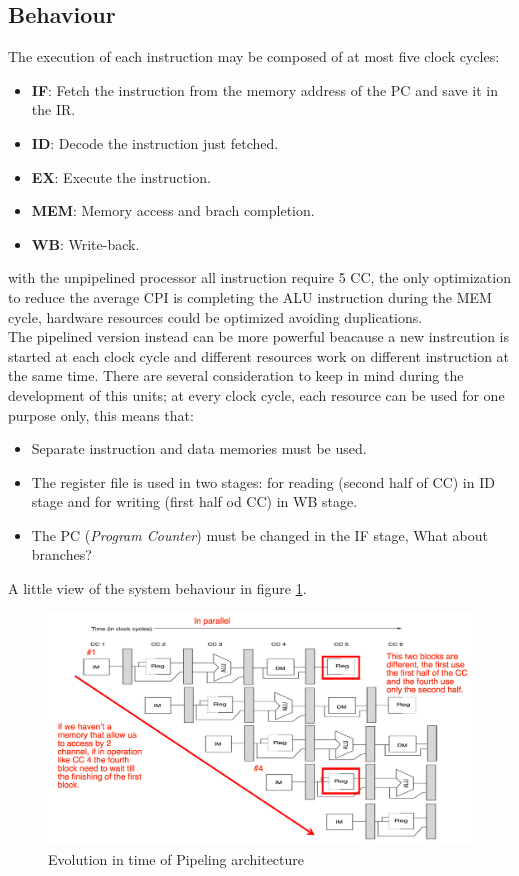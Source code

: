 \documentclass[12pt]{article}
\begin{document}
\subsection{Behaviour}
The execution of each instruction may be composed of at most five clock cycles:
\begin{itemize}
  \item \textbf{IF}: Fetch the instruction from the memory address of the PC and save it in the IR.
  \item \textbf{ID}: Decode the instruction just fetched.
  \item \textbf{EX}: Execute the instruction.
  \item \textbf{MEM}: Memory access and brach completion.
  \item \textbf{WB}: Write-back.
\end{itemize}
with the unpipelined processor all instruction require 5 CC, the only optimization to reduce the average CPI is completing the ALU instruction during the MEM cycle, hardware resources could be optimized avoiding duplications.\\
The pipelined version instead can be more powerful beacause a new instrcution is started at each clock cycle and different  resources work on different instruction at the same time. There are several consideration to keep in mind during the development of this units; at every clock cycle, each resource can be used for one purpose only, this means that:
\begin{itemize}
  \item Separate instruction and data memories must be used.
  \item The register file is used in two stages: for reading (second half of CC) in ID stage and for writing (first half od CC) in WB stage.
  \item The PC (\textit{Program Counter}) must be changed in the IF stage, What about branches?
\end{itemize}
A little view of the system behaviour in figure \ref{fig:time_evo_pipe}.
\begin{figure}[h!]
  \centering
  \includegraphics[width=\linewidth]{images/time_evo_pipe.png}
  \caption{Evolution in time of Pipeling architecture}
  \label{fig:time_evo_pipe}
\end{figure}
\end{document}
